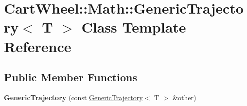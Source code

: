 \hypertarget{classCartWheel_1_1Math_1_1GenericTrajectory}{
\section{CartWheel::Math::GenericTrajectory$<$ T $>$ Class Template Reference}
\label{classCartWheel_1_1Math_1_1GenericTrajectory}
}
\subsection*{Public Member Functions}
\begin{DoxyCompactItemize}
\item 
\hypertarget{classCartWheel_1_1Math_1_1GenericTrajectory_a12d8a4b9aa360c65cebbc2222d06cb71}{
{\bfseries GenericTrajectory} (const \hyperlink{classCartWheel_1_1Math_1_1GenericTrajectory}{GenericTrajectory}$<$ T $>$ \&other)}
\label{classCartWheel_1_1Math_1_1GenericTrajectory_a12d8a4b9aa360c65cebbc2222d06cb71}


\end{DoxyCompactItemize}
